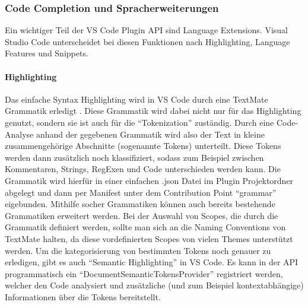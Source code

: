 \subsubsection{Code Completion und Spracherweiterungen}
  Ein wichtiger Teil der VS Code Plugin API sind Language Extensions. Visual Studio Code unterscheidet
  bei diesen Funktionen nach Highlighting, Language Features und Snippets.
  \paragraph{Highlighting}
  Das einfache Syntax Highlighting wird in VS Code durch eine TextMate Grammatik erledigt \cite{TextMateGrammar}.
  Diese Grammatik wird dabei nicht nur für das Highlighting genutzt, sondern sie ist auch für die \enquote{Tokenization}
  zuständig. Durch eine Code-Analyse anhand der gegebenen Grammatik wird also der Text in kleine 
  zusammengehörige Abschnitte (sogenannte Tokens) unterteilt. Diese Tokens werden dann zusätzlich noch 
  klassifiziert, sodass zum Beispiel zwischen Kommentaren, Strings, RegExen und Code unterschieden werden kann.
  Die Grammatik wird hierfür in einer einfachen .json Datei im Plugin Projektordner abgelegt und dann per Manifest
  unter dem Contribution Point \enquote{grammar} eigebunden. Mithilfe socher Grammatiken können auch bereits bestehende
  Grammatiken erweitert werden. Bei der Auswahl von Scopes, die durch die Grammatik definiert werden, sollte man sich
  an die Naming Conventions von TextMate halten, da diese vordefinierten Scopes von vielen Themes unterstützt werden.
  Um die kategorisierung von bestimmten Tokens noch genauer zu erledigen, gibt es auch \enquote{Semantic Highlighting} 
  in VS Code. Es kann in der API programmatisch ein \enquote{DocumentSemanticTokensProvider} registriert werden,
  welcher den Code analysiert und zusätzliche (und zum Beispiel kontextabhängige) Informationen über die Tokens bereitstellt.
